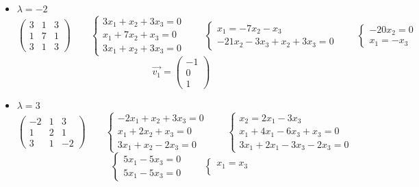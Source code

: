 \begin{itemize}
	\item $ \lambda = -2 $
    $$
    \begin{pmatrix}
    	3 & 1 & 3 \\
        1 & 7 & 1 \\
        3 & 1 & 3
    \end{pmatrix} \qquad
    \begin{cases}
    	3x_1 + x_2 + 3x_3 = 0 \\
        x_1 + 7x_2 + x_3 = 0 \\
        3x_1 + x_2 + 3x_3 = 0
    \end{cases} \qquad
    \begin{cases}
    	x_1 = -7x_2 - x_3 \\
        -21x_2 - 3x_3 + x_2 + 3x_3 = 0
    \end{cases} \qquad
    \begin{cases}
    	-20x_2 = 0 \\
        x_1 = -x_3
    \end{cases} $$
    $$ \vec{v_1} =
    \begin{pmatrix}
    	-1 \\
        0 \\
        1
    \end{pmatrix} $$
    \item $ \lambda = 3 $
    $$
    \begin{pmatrix}
    	-2 & 1 & 3 \\
        1 & 2 & 1 \\
        3 & 1 & -2
    \end{pmatrix} \qquad
    \begin{cases}
    	-2x_1 + x_2 + 3x_3 = 0 \\
        x_1 + 2x_2 + x_3 = 0 \\
        3x_1 + x_2 - 2x_3 = 0
    \end{cases} \qquad
    \begin{cases}
    	x_2 = 2x_1 - 3x_3 \\
        x_1 + 4x_1 - 6x_3 + x_3 = 0 \\
        3x_1 + 2x_1 - 3x_3 - 2x_3 = 0
    \end{cases} $$
    $$
    \begin{cases}
    	5x_1 - 5x_3 = 0 \\
        5x_1 - 5x_3 = 0
    \end{cases} \qquad
    \begin{cases}
    	x_1 = x_3 \\

\end{cases}$$
\end{itemize}
